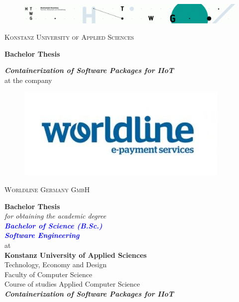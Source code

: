 
\begin{titlepage}
\vspace*{15mm}
\begin{figure}[h]
\centering
\includegraphics[width=\textwidth]{fig/ain}
\label{fig:unilogo}
\end{figure}
{
\center
{\LARGE \textsc{Konstanz University of Applied Sciences}}\\
\vspace*{10mm}

\textbf{{\Large Bachelor Thesis}}\\
\vspace*{40mm}

\textbf{{\Large \textit{Containerization of Software Packages for IIoT}}}\\ \vspace*{5mm}
{at the company }\\
\begin{figure}[h]
\centering
\includegraphics{fig/wl.jpg}
\label{fig:unilogo}
\end{figure}
\vspace*{10mm}
{\Large \textsc{Worldline Germany GmbH}}

}


\newpage
\thispagestyle{empty}

{
\center
\vspace*{15mm}
{\Huge \textbf{Bachelor Thesis}}\\ \vspace*{5mm}
\emph{for obtaining the academic degree \\ \vspace*{5mm}
{\LARGE \textbf{\textcolor{blue}{Bachelor of Science (B.Sc.) \\ Software Engineering}}} }\\
\vspace*{10mm}
{at}\\
\vspace*{10mm}
{\large \textbf{Konstanz University of Applied Sciences}}\\ \vspace*{5mm}
{Technology, Economy and Design \\ \vspace*{1mm} Faculty of Computer Science  \\ \vspace*{1mm} 
Course of studies Applied Computer Science}\\ \vspace*{10mm}
{\LARGE \textbf{\textit{Containerization of Software Packages for IIoT }}} 

}
\end{titlepage}

